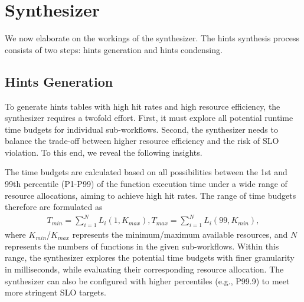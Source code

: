 \section{Synthesizer}
\label{sec:synthesizer}

We now elaborate on the workings of the synthesizer. 
The hints synthesis process consists of two steps: hints generation and hints condensing. 

\subsection{Hints Generation}
\label{sec:synthesizer:generate}
To generate hints tables with high hit rates and high resource efficiency, the synthesizer requires a twofold effort.
First, it must explore all potential runtime time budgets for individual sub-workflows.
Second, the synthesizer needs to balance the trade-off between higher resource efficiency and the risk of SLO violation.
To this end, we reveal the following insights.

The time budgets are calculated based on all possibilities between the 1st and 99th percentile (P1-P99) of the function execution time under a wide range of resource allocations, aiming to achieve high hit rates.
The range of time budgets therefore are formulated as
\begin{eqnarray}
    T_{min}= \sum_{i=1}^NL_i(1,K_{max}),
    T_{max}= \sum_{i=1}^NL_i(99,K_{min}),
\end{eqnarray}
where $K_{min}$/$K_{max}$ represents the minimum/maximum available resources,
and $N$ represents the numbers of functions in the given sub-workflows. Within this range, the synthesizer explores the potential time budgets with finer granularity in milliseconds, while evaluating their corresponding resource allocation.
The synthesizer can also be configured with higher percentiles (e.g., P99.9) to meet more stringent SLO targets.

